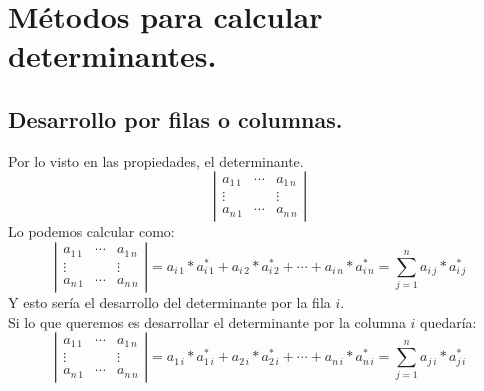 \documentclass[a4paper,11pt,answers]{exam}
\newcommand\adjunto[1]{#1^\text{*}}
\begin{document}
\section{Métodos para calcular determinantes.}
\subsection{Desarrollo por filas o columnas.}
Por lo visto en las propiedades, el determinante.
\[\left|\begin{array}{rrrr}
a_{1\,1}&\cdots&a_{1\,n}\\
\vdots&&\vdots\\
a_{n\,1}&\cdots&a_{n\,n}
\end{array}\right|\]
Lo podemos calcular como:
\[\left|\begin{array}{rrrr}
a_{1\,1}&\cdots&a_{1\,n}\\
\vdots&&\vdots\\
a_{n\,1}&\cdots&a_{n\,n}
\end{array}\right| = a_{i\,1}*\adjunto{a_{i\,1}} + a_{i\,2}*\adjunto{a_{i\,2}} + \cdots
+ a_{i\,n}*\adjunto{a_{i\,n}} = \sum_{j=1}^n a_{i\,j}*\adjunto{a_{i\,j}}\]
Y esto sería el desarrollo del determinante por la fila $i$.\\

Si lo que queremos es desarrollar el determinante por la columna $i$ quedaría:
\[\left|\begin{array}{rrrr}
a_{1\,1}&\cdots&a_{1\,n}\\
\vdots&&\vdots\\
a_{n\,1}&\cdots&a_{n\,n}
\end{array}\right| = a_{1\,i}*\adjunto{a_{1\,i}} + a_{2\,i}*\adjunto{a_{2\,i}} + \cdots
+ a_{n\,i}*\adjunto{a_{n\,i}} = \sum_{j=1}^n a_{j\,i}*\adjunto{a_{j\,i}}\]
\end{document}
